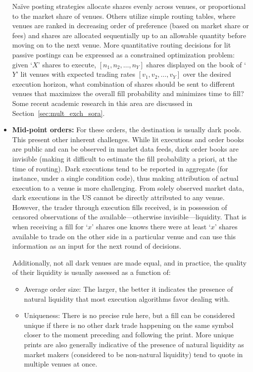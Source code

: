\begin{itemize}
Na\"ive posting strategies allocate shares evenly across venues, or proportional to the market share of venues. Others utilize simple routing tables, where venues are ranked in decreasing order of preference (based on market share or fees) and shares are allocated sequentially up to an allowable quantity before moving on to the next venue. More quantitative routing decisions for lit passive postings can be expressed as a constrained optimization problem: given `$X$' shares to execute, $[n_1, n_2, \ldots, n_Y]$ shares displayed on the book of `$Y$' lit venues with expected trading rates $[v_1, v_2, \ldots, v_Y]$ over the desired execution horizon, what combination of shares should be sent to different venues that maximizes the overall fill probability and minimizes time to fill? Some recent academic research in this area are discussed in Section~\ref{sec:mult_exch_sora}.


\item \textbf{Mid-point orders:} For these orders, the destination is usually dark pools. This present other inherent challenges. While lit executions and order books are public and can be observed in market data feeds, dark order books are invisible (making it difficult to estimate the fill probability a priori, at the time of routing). Dark executions tend to be reported in aggregate (for instance, under a single condition code), thus making attribution of actual execution to a venue is more challenging. From solely observed market data, dark executions in the US cannot be directly attributed to any venue. However, the trader through execution fills received, is in possession of censored observations of the available---otherwise invisible---liquidity. That is when receiving a fill for `$x$' shares one knows there were at least `$x$' shares available to trade on the other side in a particular venue and can use this information as an input for the next round of decisions. 


Additionally, not all dark venues are made equal, and in practice, the quality of their liquidity is usually assessed as a function of: 

\begin{itemize}
\item Average order size: The larger, the better it indicates the presence of natural liquidity that most execution algorithms favor dealing with.

\item Uniqueness: There is no precise rule here, but a fill can be considered unique if there is no other dark trade happening on the same symbol closer to the moment preceding and following the print. More unique prints are also generally indicative of the presence of natural liquidity as market makers (considered to be non-natural liquidity) tend to quote in multiple venues at once.


\end{itemize}
\end{itemize}
